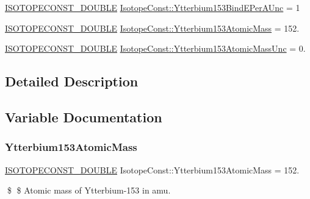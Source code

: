 \begin{DoxyCompactItemize}
\mbox{\hyperlink{group___isotope_const-_macros_ga8f45a7272ce02c0b4c65c44636ed719a}{I\+S\+O\+T\+O\+P\+E\+C\+O\+N\+S\+T\+\_\+\+D\+O\+U\+B\+LE}} \mbox{\hyperlink{group___isotope_const-_ytterbium-_yb153_gab9ba82202ff22d313f1c198815f9cee8}{Isotope\+Const\+::\+Ytterbium153\+Bind\+E\+Per\+A\+Unc}} = 1
\item 
\mbox{\hyperlink{group___isotope_const-_macros_ga8f45a7272ce02c0b4c65c44636ed719a}{I\+S\+O\+T\+O\+P\+E\+C\+O\+N\+S\+T\+\_\+\+D\+O\+U\+B\+LE}} \mbox{\hyperlink{group___isotope_const-_ytterbium-_yb153_ga1306bf0fb7a0c49a08ef26f3dfaf75d2}{Isotope\+Const\+::\+Ytterbium153\+Atomic\+Mass}} = 152.
\item 
\mbox{\hyperlink{group___isotope_const-_macros_ga8f45a7272ce02c0b4c65c44636ed719a}{I\+S\+O\+T\+O\+P\+E\+C\+O\+N\+S\+T\+\_\+\+D\+O\+U\+B\+LE}} \mbox{\hyperlink{group___isotope_const-_ytterbium-_yb153_gaf9983706f51cc2070c8096a9da22df07}{Isotope\+Const\+::\+Ytterbium153\+Atomic\+Mass\+Unc}} = 0.
\end{DoxyCompactItemize}


\subsection{Detailed Description}


\subsection{Variable Documentation}
\mbox{\label{group___isotope_const-_ytterbium-_yb153_ga1306bf0fb7a0c49a08ef26f3dfaf75d2}} 
\subsubsection{\texorpdfstring{Ytterbium153\+Atomic\+Mass}{Ytterbium153AtomicMass}}
{\footnotesize\ttfamily \mbox{\hyperlink{group___isotope_const-_macros_ga8f45a7272ce02c0b4c65c44636ed719a}{I\+S\+O\+T\+O\+P\+E\+C\+O\+N\+S\+T\+\_\+\+D\+O\+U\+B\+LE}} Isotope\+Const\+::\+Ytterbium153\+Atomic\+Mass = 152.}

\$ \$ Atomic mass of Ytterbium-\/153 in amu. \mbox{\label{group___isotope_const-_ytterbium-_yb153_gaf9983706f51cc2070c8096a9da22df07}} 
